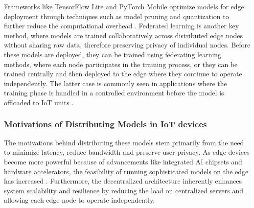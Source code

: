\documentclass[conference]{IEEEtran}
\begin{document}
Frameworks like TensorFlow Lite and PyTorch Mobile optimize models for edge deployment through techniques such as model pruning and quantization to further reduce the computational overhead \cite{zhang2020deep}. Federated learning is another key method, where models are trained collaboratively across distributed edge nodes without sharing raw data, therefore preserving privacy of individual nodes. Before these models are deployed, they can be trained using federating learning methods, where each node participates in the training process, or they can be trained centrally and then deployed to the edge where they continue to operate independently. The latter case is commonly seen in applications where the training phase is handled in a controlled environment before the model is offloaded to IoT units \cite{filho2022systematic}.



\subsubsection{Motivations of Distributing Models in IoT devices}

The motivations behind distributing these models stem primarily from the need to minimize latency, reduce bandwidth and preserve user privacy. As edge devices become more powerful because of advancements like integrated AI chipsets and hardware accelerators, the feasibility of running sophisticated models on the edge has increased \cite{grzesik2024combining}. Furthermore, the decentralized architecture inherently enhances system scalability and resilience by reducing the load on centralized servers and allowing each edge node to operate independently.
\end{document}
